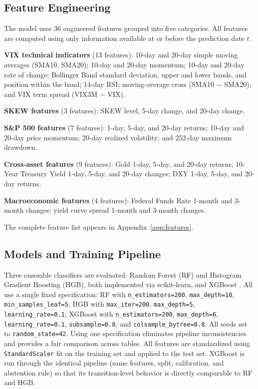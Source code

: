 \documentclass[12pt]{article}
\begin{document}
\subsection{Feature Engineering}

The model uses 36 engineered features grouped into five categories. All features are computed
using only information available at or before the prediction date $t$.

\textbf{VIX technical indicators} (13 features): 10-day and 20-day simple moving averages
(SMA10, SMA20); 10-day and 20-day momentum; 10-day and 20-day rate of change; Bollinger Band
standard deviation, upper and lower bands, and position within the band; 14-day RSI;
moving-average cross (SMA10 $-$ SMA20); and VIX term spread (VIX3M $-$ VIX).

\textbf{SKEW features} (3 features): SKEW level, 5-day change, and 20-day change.

\textbf{S\&P 500 features} (7 features): 1-day, 5-day, and 20-day returns; 10-day and 20-day
price momentum; 20-day realized volatility; and 252-day maximum drawdown.

\textbf{Cross-asset features} (9 features): Gold 1-day, 5-day, and 20-day returns; 10-Year
Treasury Yield 1-day, 5-day, and 20-day changes; DXY 1-day, 5-day, and 20-day returns.

\textbf{Macroeconomic features} (4 features): Federal Funds Rate 1-month and 3-month changes;
yield curve spread 1-month and 3-month changes.

The complete feature list appears in Appendix~\ref{app:features}.

\subsection{Models and Training Pipeline}

Three ensemble classifiers are evaluated: Random Forest (RF) and Histogram Gradient Boosting
(HGB), both implemented via scikit-learn, and XGBoost \citep{chen2016}. All use a single fixed
specification: RF with \texttt{n\_estimators=200}, \texttt{max\_depth=10},
\texttt{min\_samples\_leaf=5}; HGB with \texttt{max\_iter=200}, \texttt{max\_depth=5},
\texttt{learning\_rate=0.1}; XGBoost with \texttt{n\_estimators=200}, \texttt{max\_depth=6},
\texttt{learning\_rate=0.1}, \texttt{subsample=0.8}, and
\texttt{colsample\_bytree=0.8}. All seeds set to \texttt{random\_state=42}. Using one specification eliminates pipeline inconsistencies
and provides a fair comparison across tables. All features are standardized using
\texttt{StandardScaler} fit on the training set and applied to the test set. XGBoost is run
through the identical pipeline (same features, split, calibration, and abstention rule) so that
its transition-level behavior is directly comparable to RF and HGB.
\end{document}
